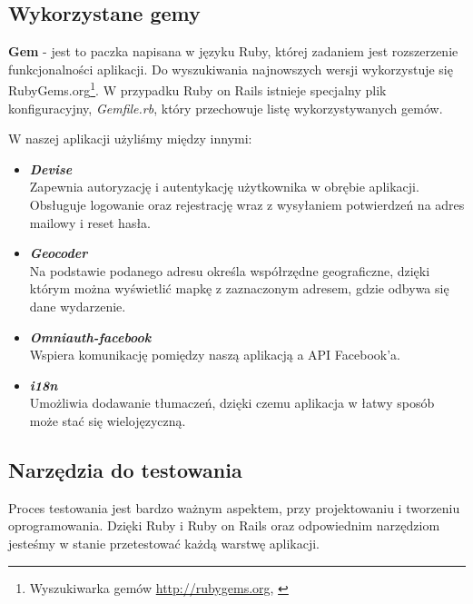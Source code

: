   \subsection{Wykorzystane gemy}
    \textbf{Gem} - jest to paczka napisana w języku Ruby, której zadaniem jest rozszerzenie funkcjonalności aplikacji. Do wyszukiwania najnowszych wersji wykorzystuje się RubyGems.org\footnote{Wyszukiwarka gemów \url{http://rubygems.org}, \cite{rubydoc}}. W przypadku Ruby on Rails istnieje specjalny plik konfiguracyjny, \emph{Gemfile.rb}, który przechowuje listę wykorzystywanych gemów.

    W naszej aplikacji użyliśmy między innymi:
    \begin{itemize}
      \item \textbf{\emph{Devise}} \\ Zapewnia autoryzację i autentykację użytkownika w obrębie aplikacji. Obsługuje logowanie oraz rejestrację wraz z wysyłaniem potwierdzeń na adres mailowy i reset hasła.
      \item \textbf{\emph{Geocoder}} \\ Na podstawie podanego adresu określa współrzędne geograficzne, dzięki którym można wyświetlić mapkę z zaznaczonym adresem, gdzie odbywa się dane wydarzenie.
      \item \textbf{\emph{Omniauth-facebook}} \\ Wspiera komunikację pomiędzy naszą aplikacją a API Facebook'a.
      \item \textbf{\emph{i18n}} \\ Umożliwia dodawanie tłumaczeń, dzięki czemu aplikacja w łatwy sposób może stać się wielojęzyczną.
    \end{itemize}

  \subsection{Narzędzia do testowania}
    Proces testowania jest bardzo ważnym aspektem, przy projektowaniu i tworzeniu oprogramowania. Dzięki Ruby i Ruby on Rails oraz odpowiednim narzędziom jesteśmy w stanie przetestować każdą warstwę aplikacji.

